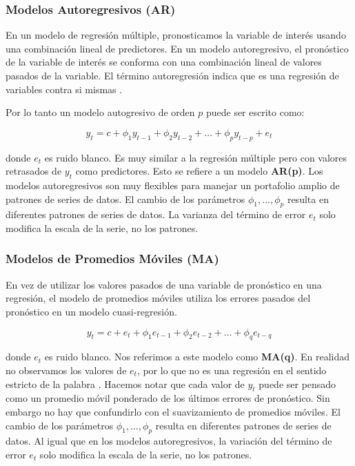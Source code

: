\subsubsection{Modelos Autoregresivos (AR)}
En un modelo de regresión múltiple, pronosticamos la variable de interés usando una combinación lineal de predictores. En un modelo autoregresivo, el pronóstico de la variable de interés se conforma con una combinación lineal de valores pasados de la variable. El término autoregresión indica que es una regresión de variables contra si mismas \cite{hyndman}.

Por lo tanto un modelo autogresivo de orden $p$ puede ser escrito como:

\[ y_{t} = c + \phi_{1}y_{t-1} + \phi_{2}y_{t-2} + \ldots + \phi_{p}y_{t-p} + e_{t}  \]

donde $e_{t}$ es ruido blanco. Es muy similar a la regresión múltiple pero con valores retrasados de $y_{t}$ como predictores. Esto se refiere a un modelo \textbf{AR(p)}. Los modelos autoregresivos son muy flexibles para manejar un portafolio amplio de patrones de series de datos. El cambio de los parámetros $\phi_1, \ldots, \phi_{p}$ resulta en diferentes patrones de series de datos. La varianza del término de error $e_t$ solo modifica la escala de la serie, no los patrones.

\subsubsection{Modelos de Promedios Móviles (MA)}
En vez de utilizar los valores pasados de una variable de pronóstico en una regresión, el modelo de promedios móviles utiliza los errores pasados del pronóstico en un modelo cuasi-regresión.

\[ y_{t} = c + e_{t} + \phi_{1}e_{t-1} + \phi_{2}e_{t-2} + \ldots + \phi_{q}e_{t-q} \]

donde $e_{t}$ es ruido blanco. Nos referimos a este modelo como \textbf{MA(q)}. En realidad no observamos los valores de $e_{t}$, por lo que no es una regresión en el sentido estricto de la palabra \cite{hyndman}. Hacemos notar que cada valor de $y_{t}$ puede ser pensado como un promedio móvil ponderado de los últimos errores de pronóstico. Sin embargo no hay que confundirlo con el suavizamiento de promedios móviles. El cambio de los parámetros $\phi_1, \ldots, \phi_{p}$ resulta en diferentes patrones de series de datos. Al igual que en los modelos autoregresivos, la variación del término de error $e_t$ solo modifica la escala de la serie, no los patrones.

